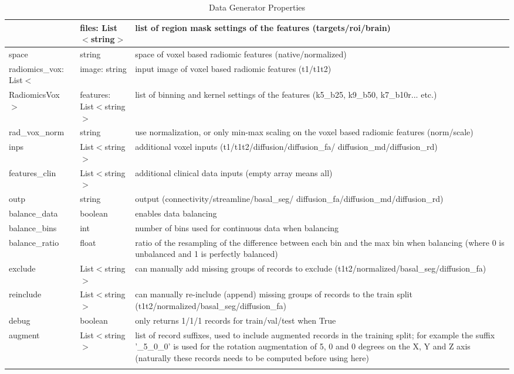 \begin{longtable}[H]{|L{3cm}|L{3cm}|L{10cm}|}
 & files: List$<$string$>$ & list of region mask settings of the features \newline (targets/roi/brain) \\ \hline
space & string & space of voxel based radiomic features \newline (native/normalized) \\ \hline
radiomics\_vox: List$<$ & image: string & input image of voxel based radiomic features \newline (t1/t1t2) \\ 
{   }RadiomicsVox \newline$>$ & features: List$<$string$>$ & list of binning and kernel settings of the features \newline (k5\_b25, k9\_b50, k7\_b10r... etc.) \\ \hline
rad\_vox\_norm & string & use normalization, or only min-max scaling on the voxel based radiomic features (norm/scale) \\ \hline
inps & List$<$string$>$ & additional voxel inputs (t1/t1t2/diffusion/diffusion\_fa/ diffusion\_md/diffusion\_rd) \\ \hline
features\_clin & List$<$string$>$ & additional clinical data inputs (empty array means all) \\ \hline
outp & string & output (connectivity/streamline/basal\_seg/ diffusion\_fa/diffusion\_md/diffusion\_rd) \\ \hline
balance\_data & boolean & enables data balancing \\ \hline
balance\_bins & int & number of bins used for continuous data when balancing \\ \hline
balance\_ratio & float & ratio of the resampling of the difference between each bin and the max bin when balancing (where 0 is unbalanced and 1 is perfectly balanced) \\ \hline
exclude & List$<$string$>$ & can manually add missing groups of records to exclude (t1t2/normalized/basal\_seg/diffusion\_fa) \\ \hline
reinclude & List$<$string$>$ & can manually re-include (append) missing groups of records to the train split (t1t2/normalized/basal\_seg/diffusion\_fa) \\ \hline
debug & boolean & only returns 1/1/1 records for train/val/test when True \\ \hline
augment & List$<$string$>$ & list of record suffixes, used to include augmented records in the training split; for example the suffix '\_5\_0\_0' is used for the rotation augmentation of 5, 0 and 0 degrees on the X, Y and Z axis (naturally these records needs to be computed before using here) \\ \hline
\caption{Data Generator Properties}
\label{tab:datagenprops}
\end{longtable}







